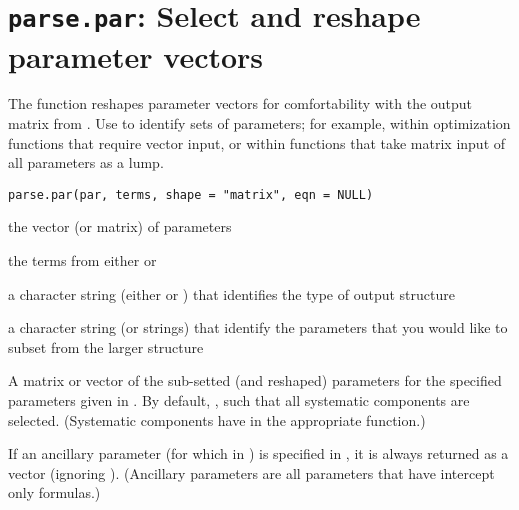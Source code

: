  \section{{\tt parse.par}: Select and reshape parameter vectors}\label{ss:parse.par}
\begin{Description}\relax
The  function reshapes parameter vectors for
comfortability with the output matrix from . 
Use  to identify sets of parameters; for example, within
optimization functions that require vector input, or within 
functions that take matrix input of all parameters as a lump.
\end{Description}
\begin{Usage}
\begin{verbatim}
parse.par(par, terms, shape = "matrix", eqn = NULL)
\end{verbatim}
\end{Usage}
\begin{Arguments}
\begin{ldescription}
\item[\code{par}] the vector (or matrix) of parameters
\item[\code{terms}] the terms from either  or 
\item[\code{shape}] a character string (either  or )
that identifies the type of output structure
\item[\code{eqn}] a character string (or strings) that identify the
parameters that you would like to subset from the larger 
structure
\end{ldescription}
\end{Arguments}
\begin{Value}
A matrix or vector of the sub-setted (and reshaped) parameters for the specified
parameters given in .   By default, , such that all systematic
components are selected.  (Systematic components have  in the appropriate 
 function.)  

If an ancillary parameter (for which  in
) is specified in , it is
always returned as a vector (ignoring ).  (Ancillary
parameters are all parameters that have intercept only formulas.)
\end{Value}
